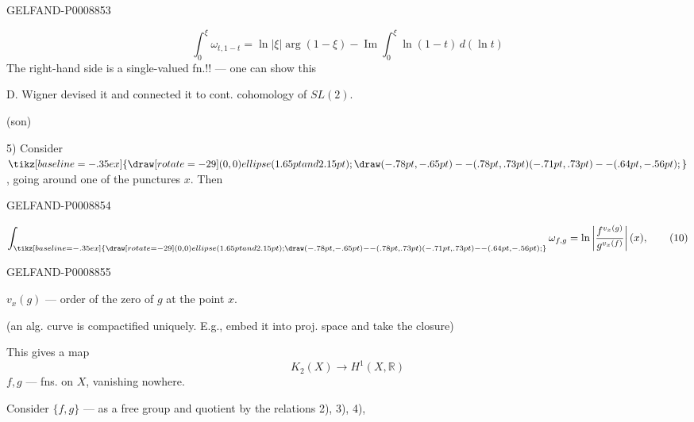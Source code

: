 \begin{GelfandAdjacentEvidence}{GELFAND-P000885}{3}

\begin{equation*}
\int_0^\xi\omega_{t,1-t}=\ln|\xi|\arg(1-\xi)-\operatorname{Im}\int_0^\xi\ln(1-t)\,d(\ln t)
\tag{9}
\end{equation*}
The right-hand side is a single-valued fn.!! --- one can show this

D. Wigner devised it and connected it to cont. cohomology of $SL(2)$.

(son)

5) Consider $\mathord{\tikz[baseline=-.35ex]{\draw[rotate=-29] (0,0) ellipse (1.65pt and 2.15pt);\draw (-.78pt,-.65pt)--(.78pt,.73pt) (-.71pt,.73pt)--(.64pt,-.56pt);}}$,
going around one of the punctures $x$. Then
\end{GelfandAdjacentEvidence}
\begin{GelfandAdjacentEvidence}{GELFAND-P000885}{4}

\begin{equation*}
\int_{\mathord{\tikz[baseline=-.35ex]{\draw[rotate=-29] (0,0) ellipse (1.65pt and 2.15pt);\draw (-.78pt,-.65pt)--(.78pt,.73pt) (-.71pt,.73pt)--(.64pt,-.56pt);}}}
\omega_{f,g}=\ln\left|\frac{f^{v_x(g)}}{g^{v_x(f)}}\right|(x),
\tag{10}
\end{equation*}
\end{GelfandAdjacentEvidence}
\begin{GelfandAdjacentEvidence}{GELFAND-P000885}{5}


$v_x(g)$ --- order of the zero of $g$ at the point $x$.

(an alg. curve is compactified uniquely. E.g., embed it into proj. space and take the closure)

This gives a map
\begin{equation*}
K_2(X)\to H^1(X,\mathbb R)
\tag{11}
\end{equation*}
$f,g$ --- fns. on $X$, vanishing nowhere.

Consider $\{f,g\}$ --- as a free group and quotient by the relations 2), 3), 4),
\end{GelfandAdjacentEvidence}



